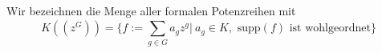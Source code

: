 %
%
%
%
%
%
Wir bezeichnen die Menge aller formalen Potenzreihen mit 
\[K\left(\left(z^{G}\right)\right) = \lbrace f := \sum_{g \in G}^{}a_g z^g |~ a_g \in K, \text{  supp}(f) \text{ ist wohlgeordnet}\rbrace\]
%
%
